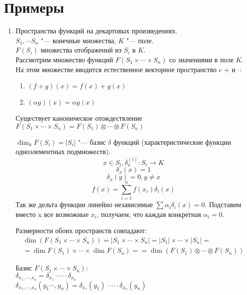 ﻿\section{Примеры}
\begin{enumerate}
    \item Пространства функций на декартовых произведениях.\\ 
    $S_1, \cdots S_n$ "--- конечные множества, $K$ "--- поле.\\ 
    $F(S_i)$ множества отображений из $S_i$ в $K$.\\
    
    Рассмотрим множество функций $F(S_1 \times \cdots \times S_n)$ со значениями в поле $K$.
    На этом множестве вводится естественное векторное пространство c + и $\cdot$:
    \begin{enumerate}
    \item $(f + g)(x) = f(x) + g(x)$\\
    \item $(\alpha g)(x) = \alpha g(x)$\\ 
    \end{enumerate}

    Существует каноническое отождествление 
    $F(S_1 \times \cdots \times S_n) = F(S_1) \otimes \cdots \otimes F(S_n)$

    $\dim_k F(S_i) = |S_i|$ "--- базис $\delta$ функций (характеристические функции одноэлементных подмножеств).
    $$x \in S_i, \delta_{x}^{(i)} \colon S_i \to K$$
    $$\delta_{x}(x) = 1$$
    $$\delta_{x}(y) = 0, y \ne x$$    
    $$f(x) = \sum_{i = 1}^{n}f(x_i)\delta_i(x)$$
    Так же дельта функции линейно независимые $\sum \alpha_i \delta_i(x) = 0$.
    Подставим вместо x все возможные $x_i$, получаем, что каждая конкретная $\alpha_i = 0$.                                         

     Размерности обоих пространств совпадают: 
    \begin{gather*}
    \dim(F(S_1 \times \cdots \times S_n)) = |S_1 \times \cdots \times S_n| = 
    |S_1| \times \cdots \times |S_n| = \\
    = \dim F(S_1) \times \cdots \times \dim F(S_n) = 
    = \dim (F(S_1) \otimes \cdots \otimes F(S_n))
    \end{gather*}

    Базис $F(S_1 \times \cdots \times S_n)$:\\
    $\delta_{x_1, \cdots, x_n} = \delta_{x_1} \cdot \cdots \cdot \delta_{x_n}$ \\
    $\delta_{x_1, \cdots, x_n}(y_1 \cdots, y_n) = \delta_{x_1}(y_1) \cdot \cdots \cdot \delta_{x_n}(y_n)$


\end{enumerate}
